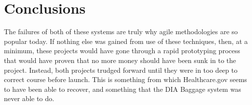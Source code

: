 \documentclass[conference]{IEEEtran}
\begin{document}
\section{Conclusions}
	The failures of both of these systems are truly why agile methodologies are so popular today. If nothing else was gained from use of these techniques, then, at a minimum, these projects would have gone through a rapid prototyping process that would have proven that no more money should have been sunk in to the project. Instead, both projects trudged forward until they were in too deep to correct course before launch. This is something from which Healthcare.gov seems to have been able to recover, and something that the DIA Baggage system was never able to do. 


\end{document}
